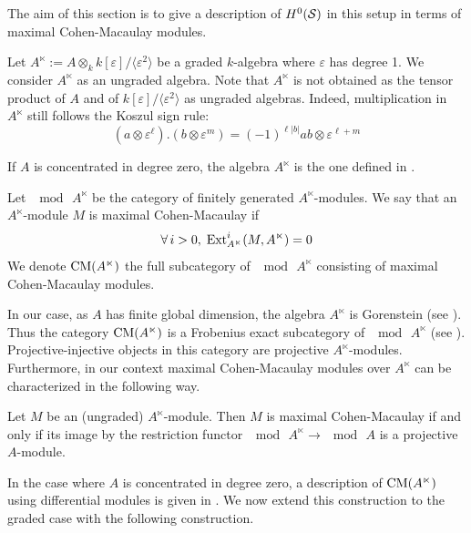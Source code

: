 \documentclass[12pt]{article}
\begin{document}
	\noindent The aim of this section is to give a description of $H^0({\cal{S}})$ in this setup in terms of maximal Cohen-Macaulay modules.
	
	\begin{definition}
		\label{Altimes}
		Let $A^\ltimes:= A \otimes_k k[\varepsilon]/\langle \varepsilon^2 \rangle$ be a graded $k$-algebra where $\varepsilon$ has degree 1. We consider $A^\ltimes$ as an ungraded algebra. Note that $A^\ltimes$ is not obtained as the tensor product of $A$ and of $k[\varepsilon]/\langle \varepsilon^2\rangle$ as ungraded algebras. Indeed, multiplication in $A^\ltimes$ still follows the Koszul sign rule:
		\[(a\otimes \varepsilon^\ell).(b \otimes \varepsilon^m) = (-1)^{\ell |b|} ab \otimes \varepsilon^{\ell+m}\]
		
		\noindent If $A$ is concentrated in degree zero, the algebra $A^\ltimes$ is the one defined in \cite{Win}.
		
		\noindent Let $\mod \, A^\ltimes$ be the category of finitely generated $A^\ltimes$-modules. We say that an $A^\ltimes$-module $M$ is maximal Cohen-Macaulay if 
		\[\forall \, i >0, \; \textup{Ext}^i_{A^\ltimes}(M,A^\ltimes) = 0\]
		We denote $\textup{CM}(A^\ltimes)$ the full subcategory of $\mod \, A^\ltimes$ consisting of maximal Cohen-Macaulay modules.
	\end{definition}
	
	\noindent In our case, as $A$ has finite global dimension, the algebra $A^\ltimes$ is Gorenstein (see \cite[Proposition~2.2]{AR}). Thus the category $\textup{CM}(A^\ltimes)$ is a Frobenius exact subcategory of $\mod \, A^\ltimes$ (see \cite{AR,Buc}). Projective-injective objects in this category are projective $A^\ltimes$-modules. Furthermore, in our context maximal Cohen-Macaulay modules over $A^\ltimes$ can be characterized in the following way.
		
	\begin{proposition}{\cite[Proposition~1.2.3]{Win}}
		\label{CMproj}
		Let $M$ be an (ungraded) $A^\ltimes$-module. Then $M$ is maximal Cohen-Macaulay if and only if its image by the restriction functor $\mod \, A^\ltimes \to \mod \, A$ is a projective $A$-module.
	\end{proposition}
	
	\noindent In the case where $A$ is concentrated in degree zero, a description of $\textup{CM}(A^\ltimes)$ using differential modules is given in \cite{Win}. We now extend this construction to the graded case with the following construction.
	
\end{document}
